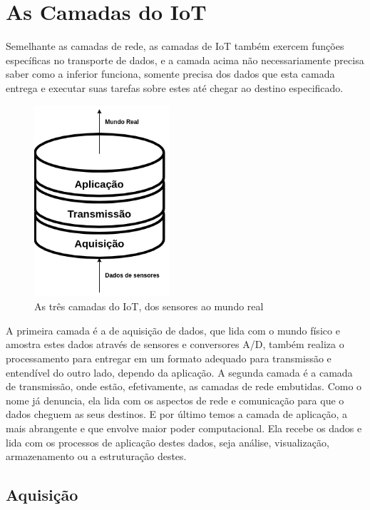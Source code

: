 \section{As Camadas do IoT}
\label{section:camadas_iot}

Semelhante as camadas de rede, as camadas de IoT também exercem funções específicas no transporte de dados, e a camada acima não necessariamente precisa saber como a inferior funciona, somente precisa dos dados que esta camada entrega e executar suas tarefas sobre estes até chegar ao destino especificado.

\begin{figure}[h!]
\label{fig:1.1.0/camadas_iot}
\centering
\includegraphics[width=5cm]{./02_Capitulos/02_Cap1/figures/iot_stack}
\caption{As três camadas do IoT, dos sensores ao mundo real}
\end{figure}

A primeira camada é a de aquisição de dados, que lida com o mundo físico e amostra estes dados através de sensores e conversores A/D, também realiza o processamento para entregar em um formato adequado para transmissão e entendível do outro lado, dependo da aplicação. A segunda camada é a camada de transmissão, onde estão, efetivamente, as camadas de rede embutidas. Como o nome já denuncia, ela lida com os aspectos de rede e comunicação para que o dados cheguem as seus destinos. E por último temos a camada de aplicação, a mais abrangente e que envolve maior poder computacional. Ela recebe os dados e lida com os processos de aplicação destes dados, seja análise, visualização, armazenamento ou a estruturação destes.

\subsection{Aquisição}
\label{subsection:aquisicao}

